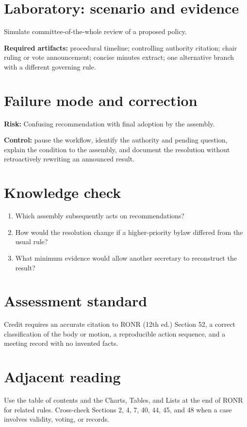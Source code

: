 \documentclass[11pt]{article}
\begin{document}
\section{Laboratory: scenario and evidence}
Simulate committee-of-the-whole review of a proposed policy.

\textbf{Required artifacts:} procedural timeline; controlling authority citation; chair ruling or vote announcement; concise minutes extract; one alternative branch with a different governing rule.

\section{Failure mode and correction}
\textbf{Risk:} Confusing recommendation with final adoption by the assembly.

\textbf{Control:} pause the workflow, identify the authority and pending question, explain the condition to the assembly, and document the resolution without retroactively rewriting an announced result.

\section{Knowledge check}
\begin{enumerate}[leftmargin=*,itemsep=4pt]
\item Which assembly subsequently acts on recommendations?
\item How would the resolution change if a higher-priority bylaw differed from the usual rule?
\item What minimum evidence would allow another secretary to reconstruct the result?
\end{enumerate}

\section{Assessment standard}
Credit requires an accurate citation to RONR (12th ed.) Section 52, a correct classification of the body or motion, a reproducible action sequence, and a meeting record with no invented facts.

\section{Adjacent reading}
Use the table of contents and the Charts, Tables, and Lists at the end of RONR for related rules. Cross-check Sections 2, 4, 7, 40, 44, 45, and 48 when a case involves validity, voting, or records.
\end{document}
